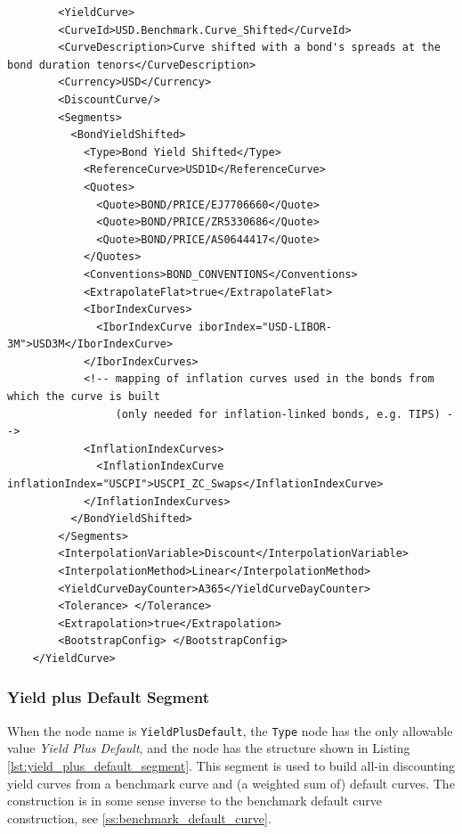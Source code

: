   \begin{listing}[H]
    \begin{verbatim}
        <YieldCurve>
        <CurveId>USD.Benchmark.Curve_Shifted</CurveId>
        <CurveDescription>Curve shifted with a bond's spreads at the bond duration tenors</CurveDescription>
        <Currency>USD</Currency>
        <DiscountCurve/>
        <Segments>
          <BondYieldShifted>
            <Type>Bond Yield Shifted</Type>
            <ReferenceCurve>USD1D</ReferenceCurve>
            <Quotes>
              <Quote>BOND/PRICE/EJ7706660</Quote>
              <Quote>BOND/PRICE/ZR5330686</Quote>
              <Quote>BOND/PRICE/AS0644417</Quote>
            </Quotes>
            <Conventions>BOND_CONVENTIONS</Conventions>
            <ExtrapolateFlat>true</ExtrapolateFlat>
            <IborIndexCurves>
              <IborIndexCurve iborIndex="USD-LIBOR-3M">USD3M</IborIndexCurve>
            </IborIndexCurves>
            <!-- mapping of inflation curves used in the bonds from which the curve is built
                 (only needed for inflation-linked bonds, e.g. TIPS) -->
            <InflationIndexCurves>
              <InflationIndexCurve inflationIndex="USCPI">USCPI_ZC_Swaps</InflationIndexCurve>
            </InflationIndexCurves>
          </BondYieldShifted>
        </Segments>
        <InterpolationVariable>Discount</InterpolationVariable>
        <InterpolationMethod>Linear</InterpolationMethod>
        <YieldCurveDayCounter>A365</YieldCurveDayCounter>
        <Tolerance> </Tolerance>
        <Extrapolation>true</Extrapolation>
        <BootstrapConfig> </BootstrapConfig>
    </YieldCurve>
    \end{verbatim}
    \caption{Bond Yield Shifted curve segment}
    \label{lst:bond_yield_shifted}
    \end{listing}


\subsubsection*{Yield plus Default Segment}
\label{sec:yield_plus_default}

When the node name is \lstinline!YieldPlusDefault!, the \lstinline!Type! node has the only allowable value \emph{Yield
 Plus Default}, and the node has the structure shown in Listing \ref{lst:yield_plus_default_segment}. This segment is
used to build all-in discounting yield curves from a benchmark curve and (a weighted sum of) default curves. The
construction is in some sense inverse to the benchmark default curve construction, see \ref{ss:benchmark_default_curve}.

